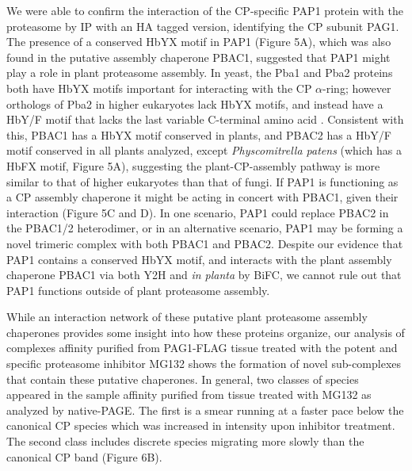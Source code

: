 We were able to confirm the interaction of the CP-specific PAP1 protein with the proteasome by IP with an HA tagged version, identifying the CP subunit PAG1. The presence of a conserved HbYX motif in PAP1 (Figure 5A), which was also found in the putative assembly chaperone PBAC1, suggested that PAP1 might play a role in plant proteasome assembly. In yeast, the Pba1 and Pba2 proteins both have HbYX motifs important for interacting with the CP $\alpha$-ring; however orthologs of Pba2 in higher eukaryotes lack HbYX motifs, and instead have a HbY/F motif that lacks the last variable C-terminal amino  acid \citep{kusmierczyk11}. Consistent with this, PBAC1 has a HbYX motif conserved in plants, and PBAC2 has a HbY/F motif conserved in all plants analyzed, except \textit{Physcomitrella patens} (which has a HbFX motif, Figure 5A), suggesting the plant-CP-assembly pathway is more similar to that of higher eukaryotes than that of fungi. If PAP1 is functioning as a CP assembly chaperone it might be acting in concert with PBAC1, given their interaction (Figure 5C and D). In one scenario, PAP1 could replace PBAC2 in the PBAC1/2 heterodimer, or in an alternative scenario, PAP1 may be forming a novel trimeric complex with both PBAC1 and PBAC2. Despite our evidence that PAP1 contains a conserved HbYX motif, and interacts with the plant assembly chaperone PBAC1 via both Y2H and \textit{in planta} by BiFC, we cannot rule out that PAP1 functions outside of plant proteasome assembly.

While an interaction network of these putative plant proteasome assembly chaperones provides some insight into how these proteins organize, our analysis of complexes affinity purified from PAG1-FLAG tissue treated with the potent and specific proteasome inhibitor MG132 shows the formation of novel sub-complexes that contain these putative chaperones. In general, two classes of species appeared in the sample affinity purified from tissue treated with MG132 as analyzed by native-PAGE. The first is a smear running at a faster pace below the canonical CP species which was increased in intensity upon inhibitor treatment. The second class includes discrete species migrating more slowly than the canonical CP band (Figure 6B). 

